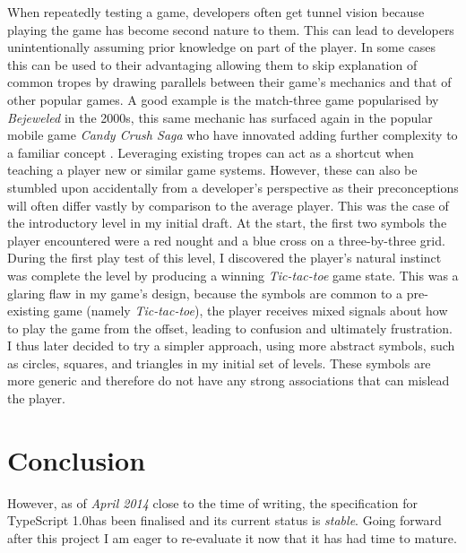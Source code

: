 \documentclass[final]{cmpreport}
\begin{document}
When repeatedly testing a game, developers often get tunnel vision because playing the game has become second nature to them. This can lead to developers unintentionally assuming prior knowledge on part of the player. In some cases this can be used to their advantaging allowing them to skip explanation of common tropes by drawing parallels between their game's mechanics and that of other popular games. A good example is the match-three game popularised by \textit{Bejeweled} in the 2000s, this same mechanic has surfaced again in the popular mobile game \textit{Candy Crush Saga} who have innovated adding further complexity to a familiar concept \citep{Juul}. Leveraging existing tropes can act as a shortcut when teaching a player new or similar game systems. However, these can also be stumbled upon accidentally from a developer's perspective as their preconceptions will often differ vastly by comparison to the average player. This was the case of the introductory level in my initial draft. At the start, the first two symbols the player encountered were a red nought and a blue cross on a three-by-three grid. During the first play test of this level, I discovered the player's natural instinct was complete the level by producing a winning \emph{Tic-tac-toe} game state. This was a glaring flaw in my game's design, because the symbols are common to a pre-existing game (namely \emph{Tic-tac-toe}), the player receives mixed signals about how to play the game from the offset, leading to confusion and ultimately frustration. I thus later decided to try a simpler approach, using more abstract symbols, such as circles, squares, and triangles in my initial set of levels. These symbols are more generic and therefore do not have any strong associations that can mislead the player.

\section{Conclusion}
However, as of \textit{April 2014} close to the time of writing, the specification for TypeScript 1.0\footnotemark has been finalised and its current status is \textit{stable}. Going forward after this project I am eager to re-evaluate it now that it has had time to mature.
\end{document}
